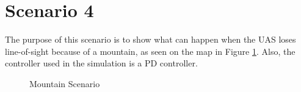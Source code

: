\section{Scenario 4}\label{sec:scenario4}
The purpose of this scenario is to show what can happen when the UAS loses line-of-sight because of a mountain, as seen on the map in Figure \ref{fig:s4_map}. Also, the controller used in the simulation is a PD controller.

\begin{figure}[H]
	\hfill
	\hfill
	\hfill
	\caption{Mountain Scenario}
	\label{fig:s4_map}
\end{figure}

